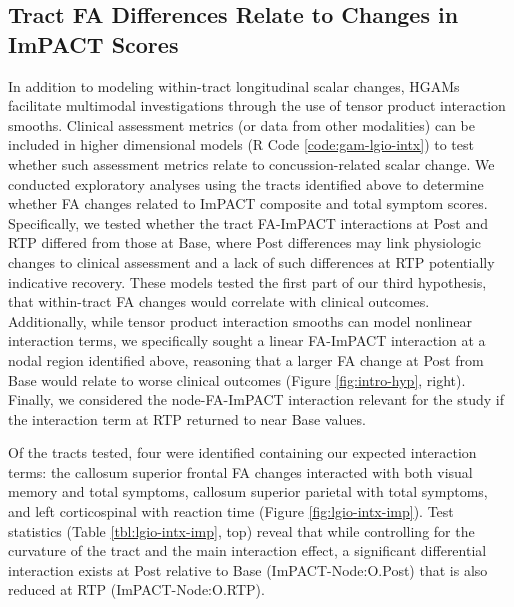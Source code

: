 \documentclass[]{imag-ms-template}
\begin{document}
\subsection{Tract FA Differences Relate to Changes in ImPACT Scores}
\label{ssec:res-dwi-imp}
In addition to modeling within-tract longitudinal scalar changes, HGAMs facilitate multimodal investigations through the use of tensor product interaction smooths. Clinical assessment metrics (or data from other modalities) can be included in higher dimensional models (R Code \ref{code:gam-lgio-intx}) to test whether such assessment metrics relate to concussion-related scalar change. We conducted exploratory analyses using the tracts identified above to determine whether FA changes related to ImPACT composite and total symptom scores. Specifically, we tested whether the tract FA-ImPACT interactions at Post and RTP differed from those at Base, where Post differences may link physiologic changes to clinical assessment and a lack of such differences at RTP potentially indicative recovery. These models tested the first part of our third hypothesis, that within-tract FA changes would correlate with clinical outcomes. Additionally, while tensor product interaction smooths can model nonlinear interaction terms, we specifically sought a linear FA-ImPACT interaction at a nodal region identified above, reasoning that a larger FA change at Post from Base would relate to worse clinical outcomes (Figure \ref{fig:intro-hyp}, right). Finally, we considered the node-FA-ImPACT interaction relevant for the study if the interaction term at RTP returned to near Base values.

Of the tracts tested, four were identified containing our expected interaction terms: the callosum superior frontal FA changes interacted with both visual memory and total symptoms, callosum superior parietal with total symptoms, and left corticospinal with reaction time (Figure \ref{fig:lgio-intx-imp}). Test statistics (Table \ref{tbl:lgio-intx-imp}, top) reveal that while controlling for the curvature of the tract and the main interaction effect, a significant differential interaction exists at Post relative to Base (ImPACT-Node:O.Post) that is also reduced at RTP (ImPACT-Node:O.RTP).
\end{document}
